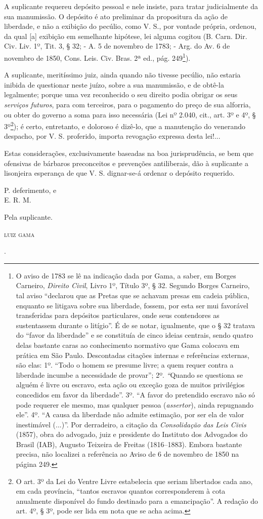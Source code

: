 {A suplicante requereu depósito pessoal e nele insiste, para tratar
judicialmente da sua manumissão. O depósito é ato preliminar da
propositura da ação de liberdade, e não a exibição do pecúlio, como V.
S., por vontade própria, ordenou, da qual {[}a{]} exibição em semelhante
hipótese, lei alguma cogitou (B. Carn. Dir. Civ. Liv. 1º, Tit. 3, § 32;
- A. 5 de novembro de 1783; - Arg. do Av. 6 de novembro de 1850, Cons.
Leis. Civ. Bras. 2ª ed., pág. 249\footnote{ O aviso de 1783 se lê na
  indicação dada por Gama, a saber, em Borges Carneiro, \emph{Direito
  Civil}, Livro 1º, Título 3º, § 32. Segundo Borges Carneiro, tal aviso
  ``declarou que as Pretas que se achavam presas em cadeia pública,
  enquanto se litigava sobre sua liberdade, fossem, por esta ser mui
  favorável transferidas para depósitos particulares, onde seus
  contendores as sustentassem durante o litígio''. É de se notar,
  igualmente, que o § 32 tratava do ``favor da liberdade'' e se constituía
  de cinco ideias centrais, sendo quatro delas bastante caras ao
  conhecimento normativo que Gama colocava em prática em São Paulo.
  Descontadas citações internas e referências externas, são elas: 1º.
  ``Todo o homem se presume livre; a quem requer contra a liberdade
  incumbe a necessidade de provar''; 2º. \emph{``}Quando se questiona se
  alguém é livre ou escravo, esta ação ou exceção goza de muitos
  privilégios concedidos em favor da liberdade''. 3º. ``A favor do
  pretendido escravo não só pode requerer ele mesmo, mas qualquer pessoa
  (\emph{assertor}), ainda repugnando ele''. 4º. ``A causa da liberdade
  não admite estimação, por ser ela de valor inestimável (...)''. Por
  derradeiro, a citação da \emph{Consolidação das Leis Civis} (1857),
  obra do advogado, juiz e presidente do Instituto dos Advogados do
  Brasil (IAB), Augusto Teixeira de Freitas (1816--1883). Embora bastante
  precisa, não localizei a referência ao Aviso de 6 de novembro de 1850
  na página 249.}).

A suplicante, meritíssimo juiz, ainda quando não tivesse pecúlio, não
estaria inibida de questionar neste juízo, sobre a sua manumissão, e de
obtê-la legalmente; porque uma vez reconhecido o seu direito podia
obrigar os seus \emph{serviços futuros}, para com terceiros, para o
pagamento do preço de sua alforria, ou obter do governo a soma para isso
necessária (Lei nº 2.040, cit., art. 3º e 4º, § 3º\footnote{ O art. 3º
  da Lei do Ventre Livre estabelecia que seriam libertados cada ano, em
  cada província, ``tantos escravos quantos corresponderem à cota
  anualmente disponível do fundo destinado para a emancipação''. A
  redação do art. 4º, § 3º, pode ser lida em nota que se acha acima.});
é certo, entretanto, e doloroso é dizê-lo, que a manutenção do venerando
despacho, por V. S. proferido, importa revogação expressa desta lei!...

Estas considerações, exclusivamente baseadas na boa jurisprudência, se
bem que ofensivas de bárbaros preconceitos e prevenções antiliberais,
dão à suplicante a lisonjeira esperança de que V. S. dignar-se-á ordenar
o depósito requerido.

P. deferimento, e\\
E. R. M.

Pela suplicante.

\textsc{luiz gama}}.

